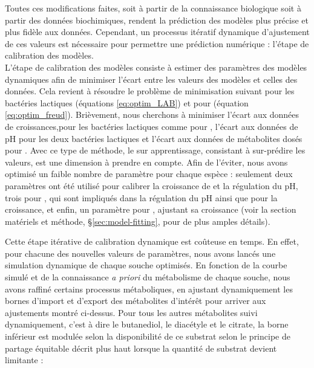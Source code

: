 \documentclass[../main.tex]{subfiles}
\begin{document}
Toutes ces modifications faites, soit à partir de la connaissance biologique soit à partir des données biochimiques, rendent la prédiction des modèles plus précise et plus fidèle aux données. Cependant, un processus itératif dynamique d'ajustement de ces valeurs est nécessaire pour permettre une prédiction numérique : l'étape de calibration des modèles. \\

L'étape de calibration des modèles consiste à estimer des paramètres des modèles dynamiques afin de minimiser l'écart entre les valeurs des modèles et celles des données. Cela revient à résoudre le problème de minimisation suivant pour les bactéries lactiques (équations \eqref{eq:optim_LAB}) et pour \freud (équation \eqref{eq:optim_freud}). Brièvement, nous cherchons à minimiser l'écart aux données de croissances,pour les bactéries lactiques comme pour \freud, l'écart aux données de pH pour les deux bactéries lactiques et l'écart aux données de métabolites dosés pour \freud. Avec ce type de méthode, le sur apprentissage, consistant à sur-prédire les valeurs, est une dimension à prendre en compte. Afin de l'éviter, nous avons optimisé un faible nombre de paramètre pour chaque espèce : seulement deux paramètres ont été utilisé pour calibrer la croissance de \lactis et la régulation du pH, trois pour \plantarum, qui sont impliqués dans la régulation du pH ainsi que pour la croissance, et enfin, un paramètre pour \freud, ajustant sa croissance (voir la section matériels et méthode, \S\ref{sec:model-fitting}, pour de plus amples détails).

Cette étape itérative de calibration dynamique est coûteuse en temps. En effet, pour chacune des nouvelles valeurs de paramètres, nous avons lancés une simulation dynamique de chaque souche optimisés. En fonction de la courbe simulé et de la connaissance \textit{a priori} du métabolisme de chaque souche, nous avons raffiné certains processus métaboliques, en ajustant dynamiquement les bornes d'import et d'export des métabolites d'intérêt pour arriver aux ajustements montré ci-dessus. Pour tous les autres métabolites suivi dynamiquement, c'est à dire le butanediol, le diacétyle et le citrate, la borne inférieur est modulée selon la disponibilité de ce substrat selon le principe de partage équitable décrit plus haut lorsque la quantité de substrat devient limitante : \\
\end{document}
